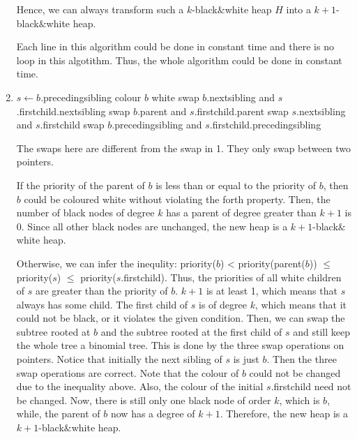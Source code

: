 \documentclass[10pt]{article}
\begin{document}
\begin{enumerate}
		Hence, we can always transform such a $k$-black$\&$white heap $H$ into a
		$k+1$-black$\&$white heap.

		Each line in this algorithm could be done in constant time and there is
		no loop in this algotithm.
		Thus, the whole algorithm could be done in constant time.

	\item
	\begin{comment}
		Suppose you have a linked-list H of binomial trees that satisfies all
		the properties of a black$&$white heap except that it has one black node
		$b$ of degree $k$ and its parent has degree greater than $k+1$.
		Suppose that the sibling $s$ of degree $k+1$ of $b$ is white.
		Given pointers to $b$ and $s$, explain how to transform H in constant
		time into a k'-black$&$white heap with the same set of nodes, for some
		$k' > k$.
	\end{comment}

		\begin{algorithmic}[1]
			\State $s \gets b$.precedingsibling
				\State colour $b$ white
			\Else
				\State swap $b$.nextsibling and $s$.firstchild.nextsibling
				\State swap $b$.parent and $s$.firstchild.parent
				\State swap $s$.nextsibling and $s$.firstchild
				\State swap $b$.precedingsibling and
				$s$.firstchild.precedingsibling
			\EndIf
		\end{algorithmic}

		The swaps here are different from the swap in 1.
		They only swap between two pointers.

		If the priority of the parent of $b$ is less than or equal to the
		priority of $b$, then $b$ could be coloured white without violating the
		forth property.
		Then, the number of black nodes of degree $k$ has a parent of degree
		greater than $k+1$ is 0.
		Since all other black nodes are unchanged, the new heap is a
		$k+1$-black$\&$white heap.

		Otherwise, we can infer the inequlity: priority($b$) <
		priority(parent($b$)) $\leq$ priority($s$) $\leq$
		priority($s$.firstchild).
		Thus, the priorities of all white children of $s$ are greater than the
		priority of $b$.
		$k+1$ is at least 1, which means that $s$ always has some child.
		The first child of $s$ is of degree $k$, which means that it could not
		be black, or it violates the given condition. 
		Then, we can swap the subtree rooted at $b$ and the subtree rooted at
		the first child of $s$ and still keep the whole tree a binomial tree. 
		This is done by the three swap operations on pointers. 
		Notice that initially the next sibling of $s$ is just $b$.
		Then the three swap operations are correct.
		Note that the colour of $b$ could not be changed due to the inequality
		above.
		Also, the colour of the initial $s$.firstchild need not be changed.
		Now, there is still only one black node of order $k$, which is $b$,
		while, the parent of $b$ now has a degree of $k+1$.
		Therefore, the new heap is a $k+1$-black$\&$white heap.


\end{enumerate}
\end{document}

